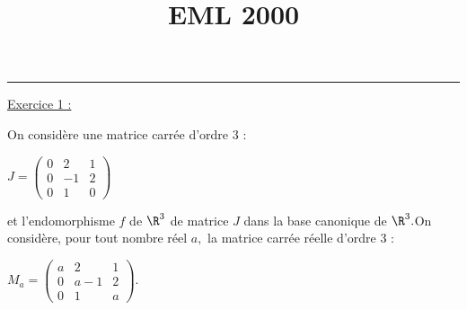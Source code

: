 \documentclass[11pt]{article}%
\title{\bf \vspace{-2cm} EML 2000} %
\author{} %
\date{} %
\begin{document}
\maketitle %
\vspace{-1.4cm}\hrule %
\thispagestyle{fancy}

\vspace*{.2cm}

\begin{center}
\underline{{\Large Exercice 1 :}}
\end{center}

On considère une matrice carrée d'ordre 3 :

\begin{center}
$J = \left( 
\begin{array}{rrr}
0 & 2 & 1 \\
0 & -1 & 2 \\
0 & 1 & 0
\end{array}
\right) $
\end{center}

et l'endomorphisme $f$ de $\R^{3}$ de matrice $J$ dans la base
canonique de $\R^{3}.$On considère, pour tout nombre réel $a, $ la
matrice carrée réelle d'ordre 3 :

\begin{center}
$M_{a} = \left( 
\begin{array}{rrr}
a & 2 & 1 \\
0 & a-1 & 2 \\
0 & 1 & a
\end{array}
\right).$
\end{center}
\end{document}
